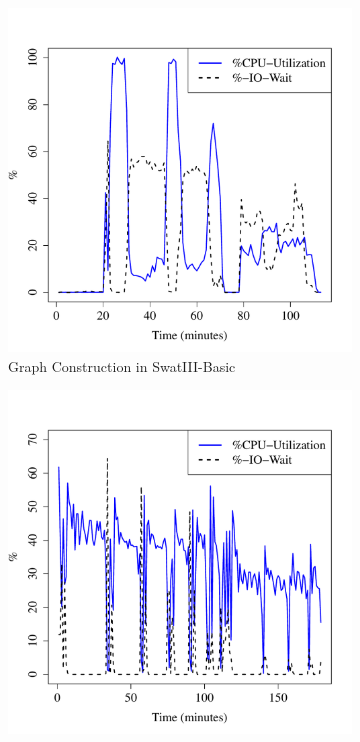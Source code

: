 \documentclass[conference]{IEEEtran}
\begin{document}
\begin{figure}[htb]
\centering
        \begin{subfigure}[b]{0.3\textwidth}
                \includegraphics[width=\textwidth]{Figure/SystemData/Plots/BGCPUHDD.pdf}
                \caption{Graph Construction in SwatIII-Basic}
                \label{fig:BGCPUHDD}
        \end{subfigure}
		\begin{subfigure}[b]{0.3\textwidth}
                \includegraphics[width=\textwidth]{Figure/SystemData/Plots/ECCPUHDD.pdf}

\end{subfigure}
\end{figure}
\end{document}

